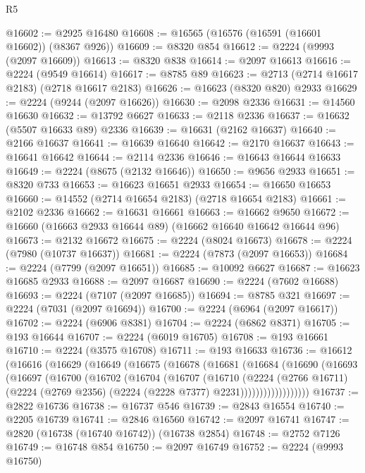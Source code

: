 \begin{lexlean}{R5}
\begin{coremodule}
@16602 := @2925 @16480
@16608 := @16565 (@16576 (@16591 (@16601 @16602)) (@8367 @926))
@16609 := @8320 @854
@16612 := @2224 (@9993 (@2097 @16609))
@16613 := @8320 @838
@16614 := @2097 @16613
@16616 := @2224 (@9549 @16614)
@16617 := @8785 @89
@16623 := @2713 (@2714 @16617 @2183) (@2718 @16617 @2183)
@16626 := @16623 (@8320 @820) @2933
@16629 := @2224 (@9244 (@2097 @16626))
@16630 := @2098 @2336
@16631 := @14560 @16630
@16632 := @13792 @6627
@16633 := @2118 @2336
@16637 := @16632 (@5507 @16633 @89) @2336
@16639 := @16631 (@2162 @16637)
@16640 := @2166 @16637
@16641 := @16639 @16640
@16642 := @2170 @16637
@16643 := @16641 @16642
@16644 := @2114 @2336
@16646 := @16643 @16644 @16633
@16649 := @2224 (@8675 (@2132 @16646))
@16650 := @9656 @2933
@16651 := @8320 @733
@16653 := @16623 @16651 @2933
@16654 := @16650 @16653
@16660 := @14552 (@2714 @16654 @2183) (@2718 @16654 @2183)
@16661 := @2102 @2336
@16662 := @16631 @16661
@16663 := @16662 @9650
@16672 := @16660 (@16663 @2933 @16644 @89) (@16662 @16640 @16642 @16644 @96)
@16673 := @2132 @16672
@16675 := @2224 (@8024 @16673)
@16678 := @2224 (@7980 (@10737 @16637))
@16681 := @2224 (@7873 (@2097 @16653))
@16684 := @2224 (@7799 (@2097 @16651))
@16685 := @10092 @6627
@16687 := @16623 @16685 @2933
@16688 := @2097 @16687
@16690 := @2224 (@7602 @16688)
@16693 := @2224 (@7107 (@2097 @16685))
@16694 := @8785 @321
@16697 := @2224 (@7031 (@2097 @16694))
@16700 := @2224 (@6964 (@2097 @16617))
@16702 := @2224 (@6906 @8381)
@16704 := @2224 (@6862 @8371)
@16705 := @193 @16644
@16707 := @2224 (@6019 @16705)
@16708 := @193 @16661
@16710 := @2224 (@3575 @16708)
@16711 := @193 @16633
@16736 := @16612
    (@16616
      (@16629
        (@16649
          (@16675
            (@16678
              (@16681
                (@16684
                  (@16690
                    (@16693
                      (@16697
                        (@16700
                          (@16702
                            (@16704
                              (@16707
                                (@16710
                                  (@2224
                                    (@2766 @16711)
                                    (@2224
                                      (@2769 @2356)
                                      (@2224 (@2228 @7377) @2231))))))))))))))))))
@16737 := @2822 @16736
@16738 := @16737 @546
@16739 := @2843 @16554
@16740 := @2205 @16739
@16741 := @2846 @16560
@16742 := @2097 @16741
@16747 := @2820 (@16738 (@16740 @16742)) (@16738 @2854)
@16748 := @2752 @7126
@16749 := @16748 @854
@16750 := @2097 @16749
@16752 := @2224 (@9993 @16750)

\end{coremodule}
\end{lexlean}
